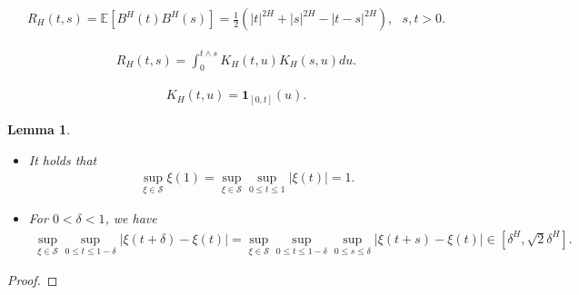 \documentclass[10pt,a4paper]{amsart}
\newtheorem{lemma}{Lemma}
\begin{document}
 \begin{align}\label{eq cov 1}  {
R_H(t, s)=\mathbb E\left[B^H(t) B^H(s) \right]=\frac12\left(|t|^{2H}+|s|^{2H}-|t-s|^{2H}\right), \ \ \ s, t>0. }
 \end{align} {

 \begin{align}\label{eq cov 2}  {
 R_H(t, s)=\int_0^{t\wedge s}K_H(t, u)K_H(s, u)du. }
 \end{align}  {

 \begin{align}\label{eq KH1} {
 K_H(t, u)=\mathbf 1_{[0,t]}(u).  }
 \end{align} {

\begin{lemma}\label{lem const}
\begin{itemize}
\item[(a)]  { It holds that }
\begin{align*}  {
\sup_{\xi \in \mathscr S}\xi(1) =\sup_{\xi \in \mathscr S}\sup_{0\le t\le 1}|\xi(t)|=1.  }
\end{align*}
\item[(b)]   {For $0<\delta<1$, we have }
\begin{align*}  {
\sup_{\xi \in \mathscr S}\sup_{0\le t\le 1-\delta}|\xi(t+\delta)-\xi(t)|   = \sup_{\xi \in \mathscr S}\sup_{0\le t\le 1-\delta}\sup_{0\le s\le \delta}|\xi(t+s)-\xi(t)| \in \left[\delta^H, \sqrt{2}\delta^H\right]. }
\end{align*}
 \end{itemize}
\end{lemma}

 \begin{proof}


\end{proof}}}}
\end{document}
